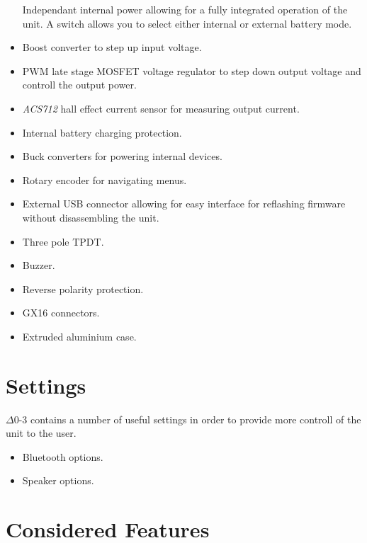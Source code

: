 \documentclass{article}
\begin{document}
\begin{multicols}{2}
\begin{itemize}
	Independant internal power allowing for a fully integrated operation of the unit. A switch allows you to select either internal or external 	battery mode.
	\item Boost converter to step up input voltage.
	\item PWM late stage MOSFET voltage regulator to step down output voltage and controll the output power.
	\item \textit{ACS712} hall effect current sensor for measuring output current.
	\item Internal battery charging protection.
	\item Buck converters for powering internal devices.
	\item Rotary encoder for navigating menus.
	\item External USB connector allowing for easy interface for reflashing firmware without disassembling the unit.
	\item Three pole TPDT.
	\item Buzzer.
	\item Reverse polarity protection.
	\item GX16 connectors.
	\item Extruded aluminium case.
\end{itemize}
\end{multicols}

\section{Settings}
$\Delta$0-3 contains a number of useful settings in order to provide more controll of the unit to the user.

\begin{itemize}
	\item Bluetooth options.
	\item Speaker options.
\end{itemize}


\section{Considered Features}
\end{document}
